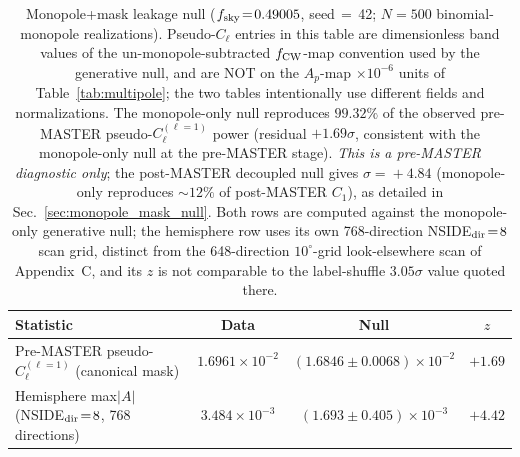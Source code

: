 \documentclass[aps,prd,twocolumn,superscriptaddress,preprintnumbers,nofootinbib,longbibliography,floatfix]{revtex4-2}
\newcommand{\sigmaunit}{\sigma}
\begin{document}
\begin{table}[tbp]
\caption{Monopole+mask leakage null ($f_{\rm sky}\!=\!0.49005$, seed$\,=\,$42; $N\!=\!500$ binomial-monopole realizations). Pseudo-$C_\ell$ entries in this table are dimensionless band values of the un-monopole-subtracted $f_{\rm CW}$-map convention used by the generative null, and are NOT on the $A_p$-map $\times10^{-6}$ units of Table~\ref{tab:multipole}; the two tables intentionally use different fields and normalizations. The monopole-only null reproduces $99.32\%$ of the observed pre-MASTER pseudo-$C_\ell^{(\ell=1)}$ power (residual $+1.69\sigmaunit$, consistent with the monopole-only null at the pre-MASTER stage). \emph{This is a pre-MASTER diagnostic only}; the post-MASTER decoupled null gives $\sigma\!=\!+4.84$ (monopole-only reproduces $\sim\!12\%$ of post-MASTER $C_1$), as detailed in Sec.~\ref{sec:monopole_mask_null}. Both rows are computed against the monopole-only generative null; the hemisphere row uses its own 768-direction NSIDE${}_{\rm dir}\!=\!8$ scan grid, distinct from the 648-direction $10^\circ$-grid look-elsewhere scan of Appendix~C, and its $z$ is not comparable to the label-shuffle $3.05\sigmaunit$ value quoted there.\label{tab:monopole_mask_null}}
\begin{ruledtabular}
\begin{tabular}{lccc}
\textbf{Statistic} & \textbf{Data} & \textbf{Null} & \textbf{$z$} \\
\hline
Pre-MASTER pseudo-$C_\ell^{(\ell=1)}$ (canonical mask) & $1.6961{\times}10^{-2}$ & $(1.6846{\pm}0.0068){\times}10^{-2}$ & $+1.69$ \\
Hemisphere max$|A|$ (NSIDE${}_{\rm dir}\!=\!8$, 768 directions) & $3.484{\times}10^{-3}$ & $(1.693{\pm}0.405){\times}10^{-3}$ & $+4.42$ \\
\end{tabular}
\end{ruledtabular}
\end{table}
\end{document}
